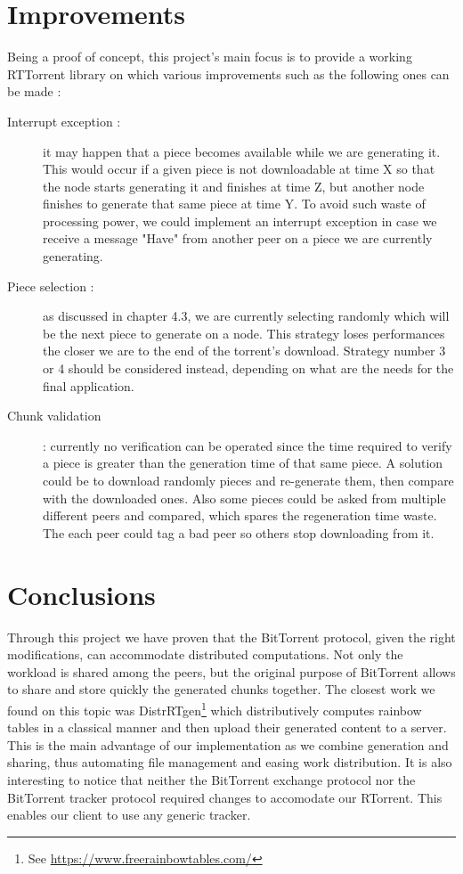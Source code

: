 \documentclass[a4paper]{article}
\begin{document}
{\section{Improvements}

Being a proof of concept, this project's main focus is to provide a working RTTorrent library on which various improvements such as the following ones can be made :\\

\begin{description}
	\item [Interrupt exception : ] it may happen that a piece becomes available while we are generating it. This would occur if a given piece is not downloadable at time X so that the node starts generating it and finishes at time Z, but another node finishes to generate that same piece at time Y. To avoid such waste of processing power, we could implement an interrupt exception in case we receive a message "Have" from another peer on a piece we are currently generating.\\
	
	\item [Piece selection : ] as discussed in chapter 4.3, we are currently selecting randomly which will be the next piece to generate on a node. This strategy loses performances the closer we are to the end of the torrent's download. Strategy number 3 or 4 should be considered instead, depending on what are the needs for the final application.\\
	
	\item [Chunk validation] : currently no verification can be operated since the time required to verify a piece is greater than the generation time of that same piece. A solution could be to download randomly pieces and re-generate them, then compare with the downloaded ones. Also some pieces could be asked from multiple different peers and compared, which spares the regeneration time waste. The each peer could tag a bad peer so others stop downloading from it.
\end{description}

\section{Conclusions}

Through this project we have proven that the BitTorrent protocol, given the right modifications, can accommodate distributed computations. Not only the workload is shared among the peers, but the original purpose of BitTorrent allows to share and store quickly the generated chunks together. The closest work we found on this topic was DistrRTgen\footnote{See \url{https://www.freerainbowtables.com/}} which distributively computes rainbow tables in a classical manner and then upload their generated content to a server. This is the main advantage of our implementation as we combine generation and sharing, thus automating file management and easing work distribution. It is also interesting to notice that neither the BitTorrent exchange protocol nor the BitTorrent tracker protocol required changes to accomodate our RTorrent. This enables our client to use any generic tracker.\\

}
\end{document}
